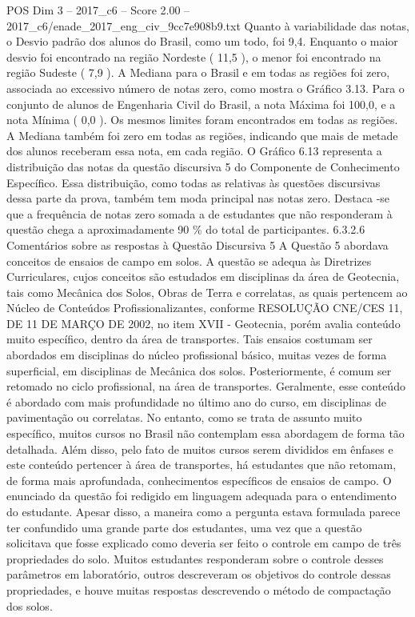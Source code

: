\begin{textsample}{POS Dim 3 – 2017\_c6 – Score 2.00 – 2017\_c6/enade\_2017\_eng\_civ\_9cc7e908b9.txt}
Quanto à variabilidade das notas, o Desvio padrão dos alunos do Brasil, como um todo, foi 9,4.
Enquanto o maior desvio foi encontrado na região Nordeste ( 11,5 ), o menor foi encontrado na região Sudeste ( 7,9 ).
A Mediana para o Brasil e em todas as regiões foi zero, associada ao excessivo número de notas zero, como mostra o Gráfico 3.13.
Para o conjunto de alunos de Engenharia Civil do Brasil, a nota Máxima foi 100,0, e a nota Mínima ( 0,0 ).
Os mesmos limites foram encontrados em todas as regiões.
A Mediana também foi zero em todas as regiões, indicando que mais de metade dos alunos receberam essa nota, em cada região.
O Gráfico 6.13 representa a distribuição das notas da questão discursiva 5 do Componente de Conhecimento Específico.
Essa distribuição, como todas as relativas às questões discursivas dessa parte da prova, também tem moda principal nas notas zero.
Destaca -se que a frequência de notas zero somada a de estudantes que não responderam à questão chega a aproximadamente 90 \% do total de participantes. 6.3.2.6 Comentários sobre as respostas à Questão Discursiva 5 A Questão 5 abordava conceitos de ensaios de campo em solos.
A questão se adequa às Diretrizes Curriculares, cujos conceitos são estudados em disciplinas da área de Geotecnia, tais como Mecânica dos Solos, Obras de Terra e correlatas, as quais pertencem ao Núcleo de Conteúdos Profissionalizantes, conforme RESOLUÇÃO CNE/CES 11, DE 11 DE MARÇO DE 2002, no item XVII - Geotecnia, porém avalia conteúdo muito específico, dentro da área de transportes.
Tais ensaios costumam ser abordados em disciplinas do núcleo profissional básico, muitas vezes de forma superficial, em disciplinas de Mecânica dos solos.
Posteriormente, é comum ser retomado no ciclo profissional, na área de transportes.
Geralmente, esse conteúdo é abordado com mais profundidade no último ano do curso, em disciplinas de pavimentação ou correlatas.
No entanto, como se trata de assunto muito específico, muitos cursos no Brasil não contemplam essa abordagem de forma tão detalhada.
Além disso, pelo fato de muitos cursos serem divididos em ênfases e este conteúdo pertencer à área de transportes, há estudantes que não retomam, de forma mais aprofundada, conhecimentos específicos de ensaios de campo.
O enunciado da questão foi redigido em linguagem adequada para o entendimento do estudante.
Apesar disso, a maneira como a pergunta estava formulada parece ter confundido uma grande parte dos estudantes, uma vez que a questão solicitava que fosse explicado como deveria ser feito o controle em campo de três propriedades do solo.
Muitos estudantes responderam sobre o controle desses parâmetros em laboratório, outros descreveram os objetivos do controle dessas propriedades, e houve muitas respostas descrevendo o método de compactação dos solos.

\end{textsample}
